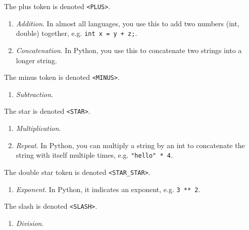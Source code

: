   \begin{example}[Plus]
    The plus token is denoted \texttt{<PLUS>}. 
    \begin{enumerate}
      \item \textit{Addition}. In almost all languages, you use this to add two numbers (int, double) together, e.g. \texttt{int x = y + z;}. 
      \item \textit{Concatenation}. In Python, you use this to concatenate two strings into a longer string. 
    \end{enumerate}
  \end{example}

  \begin{example}[Minus]
    The minus token is denoted \texttt{<MINUS>}. 
    \begin{enumerate}
      \item \textit{Subtraction}. 
    \end{enumerate}
  \end{example}
 
  \begin{example}[Star]
    The star is denoted \texttt{<STAR>}. 
    \begin{enumerate}
      \item \textit{Multiplication}. 
      \item \textit{Repeat}. In Python, you can multiply a string by an int to concatenate the string with itself multiple times, e.g. \texttt{"hello" * 4}. 
    \end{enumerate}
  \end{example}

  \begin{example}
    The double star token is denoted \texttt{<STAR\_STAR>}. 
    \begin{enumerate}
      \item \textit{Exponent}. In Python, it indicates an exponent, e.g. \texttt{3 ** 2}. 
    \end{enumerate}
  \end{example}

  \begin{example}[Slash]
    The slash is denoted \texttt{<SLASH>}. 
    \begin{enumerate}
      \item \textit{Division}. 
    \end{enumerate}
  \end{example}

